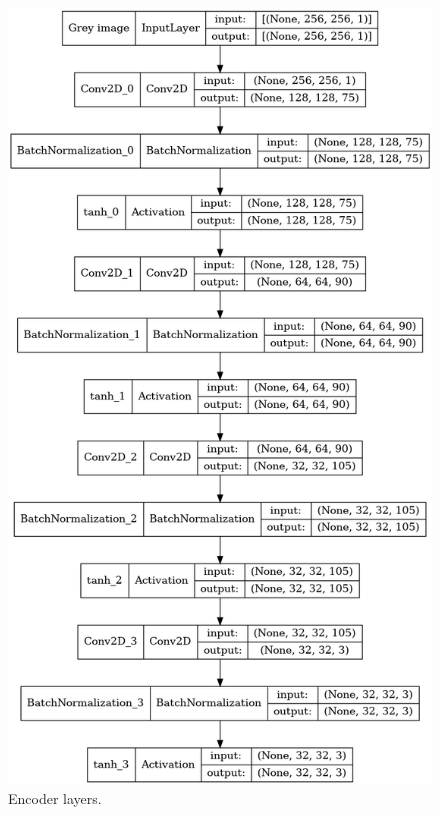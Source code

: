 \documentclass[a4paper,12pt, listof=totoc,toc=sectionentrywithdots]{scrartcl}
\begin{document}
\begin{figure}[h]
  \centering
  \begin{minipage}[b]{0.4\textwidth}
    \includegraphics[width=\textwidth]{Figures/EncoderLayer.png}
    \caption{Encoder layers.}
    \label{fig:EncoderLayer}
  \end{minipage}
  \hfill
  \begin{minipage}[b]{0.4\textwidth}

\end{minipage}
\end{figure}
\end{document}
